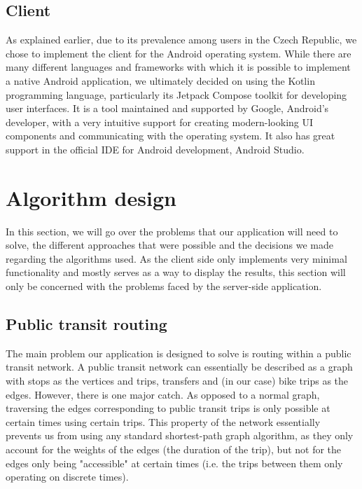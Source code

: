 \subsection{Client}

As explained earlier, due to its prevalence among users in the Czech Republic, we chose to implement the client for the Android operating system. While there are many different languages and frameworks with which it is possible to implement a native Android application, we ultimately decided on using the Kotlin programming language, particularly its Jetpack Compose toolkit for developing user interfaces. It is a tool maintained and supported by Google, Android's developer, with a very intuitive support for creating modern-looking UI components and communicating with the operating system. It also has great support in the official IDE for Android development, Android Studio.


\section{Algorithm design}

In this section, we will go over the problems that our application will need to solve, the different approaches that were possible and the decisions we made regarding the algorithms used. As the client side only implements very minimal functionality and mostly serves as a way to display the results, this section will only be concerned with the problems faced by the server-side application.

\subsection{Public transit routing}
\label{subsec:public_transit_routing}

The main problem our application is designed to solve is routing within a public transit network. A public transit network can essentially be described as a graph with stops as the vertices and trips, transfers and (in our case) bike trips as the edges.  However, there is one major catch. As opposed to a normal graph, traversing the edges corresponding to public transit trips is only possible at certain times using certain trips. This property of the network essentially prevents us from using any standard shortest-path graph algorithm, as they only account for the weights of the edges (the duration of the trip), but not for the edges only being "accessible" at certain times (i.e. the trips between them only operating on discrete times). 

